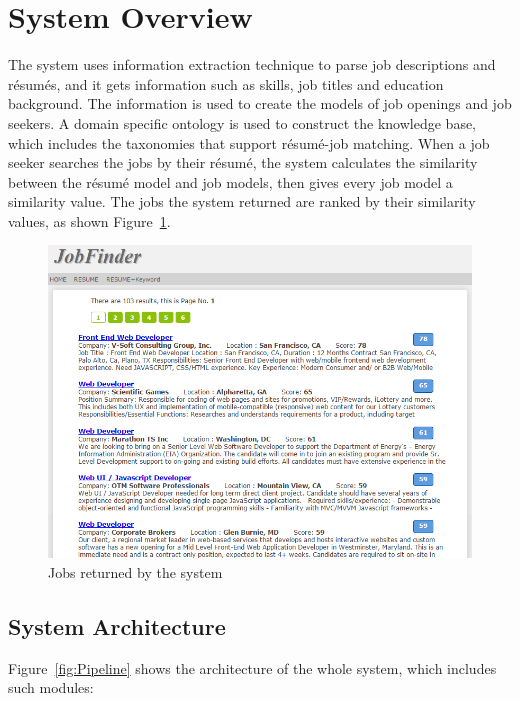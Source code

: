 \section{System Overview}
\label{sec1}

The system uses information extraction technique to parse job descriptions and r\'esum\'es, and it gets information such as skills, job titles and education background. The information is used to create the models of job openings and job seekers. A domain specific ontology is used to construct the knowledge base, which includes the taxonomies that support r\'esum\'e-job matching. When a job seeker searches the jobs by their r\'esum\'e, the system calculates the similarity between the r\'esum\'e model and job models, then gives every job model a similarity value. The jobs the system returned are ranked by their similarity values, as shown Figure~\ref{fig:result}.

\begin{figure}[htbp]
  \centering
  \includegraphics[scale=0.5]{images/match_resume.png}
  \caption{Jobs returned by the system}
  \label{fig:result}
\end{figure}

\subsection{System Architecture}

Figure~\ref{fig:Pipeline} shows the architecture of the whole system, which includes such modules:

